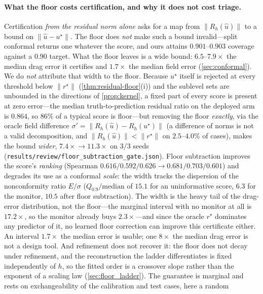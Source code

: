 \paragraph{What the floor costs certification, and why it does not cost triage.}
Certification \emph{from the residual norm alone} asks for a map from $\|R_h(\hat u)\|$ to
a bound on $\|\hat u-u^\star\|$.
The floor does \emph{not} make such a bound invalid---split conformal returns one
whatever the score, and ours attains $0.901$--$0.903$ coverage against a $0.90$ target.
What the floor leaves is a wide bound: $6.5$--$7.9\times$ the median drag error it
certifies and $1.7\times$ the median field error (\autoref{sec:conformal}). We do
\emph{not} attribute that width to the floor. Because $u^\star$ itself is rejected at
every threshold below $\|r^\star\|$ (\autoref{thm:residual-floor}(i)) and the sublevel
sets are unbounded in the directions of \autoref{prop:kernel}, a fixed part of every
score is present at zero error---the median truth-to-prediction residual ratio on the
deployed arm is $0.864$, so $86\%$ of a typical score is floor---but removing the floor
\emph{exactly}, via the oracle field difference
$\sigma'=\|R_h(\hat u)-R_h(u^\star)\|$ (a difference of norms is not a valid
decomposition, and $\|R_h(\hat u)\|<\|r^\star\|$ on $2.5$--$4.0\%$ of cases), makes the
bound \emph{wider}, $7.4\times\!\to\!11.3\times$ on $3/3$ seeds
(\texttt{results/review/floor\_subtraction\_gate.json}). Floor subtraction improves the
score's \emph{ranking} (Spearman $0.616/0.592/0.626\to0.681/0.703/0.601$) and degrades
its use as a conformal \emph{scale}: the width tracks the dispersion of the
nonconformity ratio $E/\sigma$ ($Q_{0.9}/\mathrm{median}$ of $15.1$ for an uninformative
score, $6.3$ for the monitor, $10.5$ after floor subtraction). The width is the heavy
tail of the drag-error distribution, not the floor---the marginal interval with no
monitor at all is $17.2\times$, so the monitor already buys $2.3\times$---and since the
oracle $r^\star$ dominates any predictor of it, no learned floor correction can improve
this certificate either. An interval $1.7\times$ the median error is usable; one
$8\times$ the median drag error is not a design tool. And refinement does not recover
it: the floor does not decay under refinement, and the reconstruction the ladder
differentiates is fixed independently of $h$, so the fitted order is a crossover slope
rather than the exponent of a scaling law (\autoref{sec:floor_ladder}). The guarantee is
marginal and rests on exchangeability of the calibration and test cases, here a random
